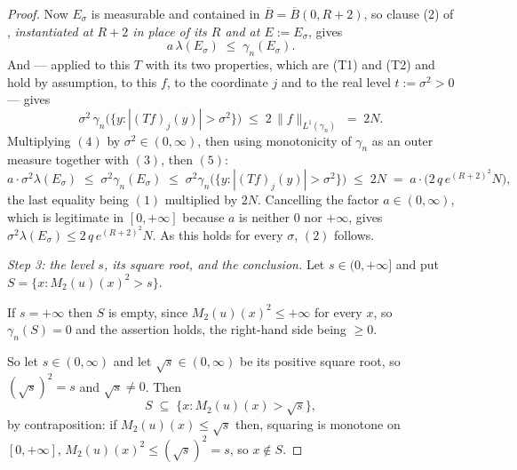 \begin{proof}
Now $E_\sigma$ is measurable and contained in $\overline B = \overline
B(0,R+2)$, so clause (2) of ,
\emph{instantiated at $R+2$ in place of its $R$ and at $E := E_\sigma$}, gives
\begin{equation*}
  a\,\lambda(E_\sigma) \;\leq\; \gamma_n(E_\sigma) . \tag{4}
\end{equation*}
And  --- applied to this $T$ with its two
properties, which are (T1) and (T2) and hold by assumption, to this $f$, to the
coordinate $j$ and to the real level $t := \sigma^2 > 0$ --- gives
\begin{equation*}
  \sigma^2\,\gamma_n\bigl(\bigl\{y : |(Tf)_j(y)| > \sigma^2\bigr\}\bigr)
    \;\leq\; 2\,\|f\|_{L^1(\gamma_n)} \;=\; 2N . \tag{5}
\end{equation*}
Multiplying $(4)$ by $\sigma^2 \in (0,\infty)$, then using monotonicity of
$\gamma_n$ as an outer measure together with $(3)$, then $(5)$:
\[
  a\cdot\sigma^2\lambda(E_\sigma)
    \;\leq\; \sigma^2\gamma_n(E_\sigma)
    \;\leq\; \sigma^2\gamma_n\bigl(\bigl\{y : |(Tf)_j(y)| > \sigma^2\bigr\}\bigr)
    \;\leq\; 2N
    \;=\; a\cdot\bigl(2\,q\,e^{(R+2)^2}N\bigr) ,
\]
the last equality being $(1)$ multiplied by $2N$.  Cancelling the factor
$a \in (0,\infty)$, which is legitimate in $[0,+\infty]$ because $a$ is neither
$0$ nor $+\infty$, gives
$\sigma^2\lambda(E_\sigma) \leq 2\,q\,e^{(R+2)^2}N$.  As this holds for every
$\sigma$, $(2)$ follows.

\emph{Step 3: the level $s$, its square root, and the conclusion.}  Let
$s \in (0,+\infty]$ and put
$S = \{x : M_2(u)(x)^2 > s\}$.

If $s = +\infty$ then $S$ is empty, since $M_2(u)(x)^2 \leq +\infty$ for every
$x$, so $\gamma_n(S) = 0$ and the assertion holds, the right-hand side being
$\geq 0$.

So let $s \in (0,\infty)$ and let $\sqrt s \in (0,\infty)$ be its positive
square root, so $(\sqrt s)^2 = s$ and $\sqrt s \neq 0$.  Then
\begin{equation*}
  S \;\subseteq\; \bigl\{x : M_2(u)(x) > \sqrt s\bigr\} , \tag{6}
\end{equation*}
by contraposition: if $M_2(u)(x) \leq \sqrt s$ then, squaring is monotone on
$[0,+\infty]$, $M_2(u)(x)^2 \leq (\sqrt s)^2 = s$, so $x \notin S$.


\end{proof}
